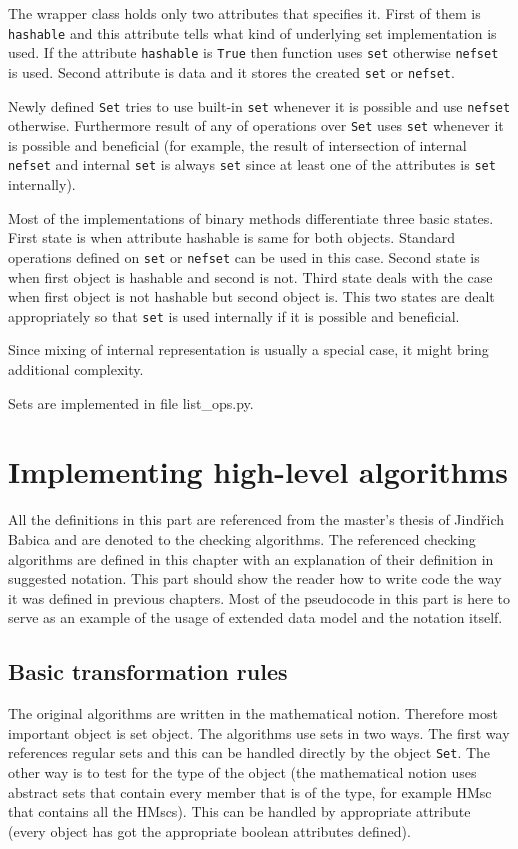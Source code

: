 \documentclass[11pt,oneside]{fithesis2}
\newcommand{\T}[1]{\texttt{#1}}
\begin{document}
The wrapper class holds only two attributes that specifies it. First of them is \T{hashable} and this attribute tells what kind of underlying set implementation is used. If the attribute \T{hashable} is \T{True} then function uses \T{set} otherwise \T{nefset} is used. Second attribute is data and it stores the created \T{set} or \T{nefset}.

Newly defined \T{Set} tries to use built-in \T{set} whenever it is possible and use \T{nefset} otherwise. Furthermore result of any of operations over \T{Set} uses \T{set} whenever it is possible and beneficial (for example, the result of intersection of internal \T{nefset} and internal \T{set} is always \T{set} since at least one of the attributes is \T{set} internally).

Most of the implementations of binary methods differentiate three basic states. First state is when attribute hashable is same for both objects. Standard operations defined on \T{set} or \T{nefset} can be used in this case. Second state is when first object is hashable and second is not. Third state deals with the case when first object is not hashable but second object is. This two states are dealt appropriately so that \T{set} is used internally if it is possible and beneficial.

Since mixing of internal representation is usually a special case, it might bring additional complexity.

Sets are implemented in file list\_ops.py.


\chapter{Implementing high-level algorithms}
All the definitions in this part are referenced from the master's thesis of Jindřich Babica\cite{babica} and are denoted to the checking algorithms. The referenced checking algorithms are defined in this chapter with an explanation of their definition in suggested notation. This part should show the reader how to write code the way it was defined in previous chapters. Most of the pseudocode in this part is here to serve as an example of the usage of extended data model and the notation itself.

\section{Basic transformation rules}
The original algorithms are written in the mathematical notion. Therefore most important object is set object. The algorithms use sets in two ways. The first way references regular sets and this can be handled directly by the object \T{Set}. The other way is to test for the type of the object (the mathematical notion uses abstract sets that contain every member that is of the type, for example HMsc that contains all the HMscs). This can be handled by appropriate attribute (every object has got the appropriate boolean attributes defined).
\end{document}
